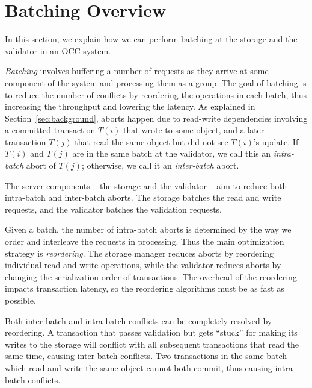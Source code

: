 \section{Batching Overview}\label{sec:overview}

In this section, we explain how we can perform batching at the storage and the validator in an OCC system. 

\emph{Batching} involves buffering a number of requests as they arrive at some component of the system and processing them as a group. The goal of batching is to reduce the number of conflicts by reordering the operations in each batch, thus increasing the throughput and lowering the latency. As explained in Section~\ref{sec:background}, aborts happen due to read-write dependencies involving a committed transaction $T(i)$ that wrote to some object, and a later transaction $T(j)$ that read the same object but did not see $T(i)$'s update. If $T(i)$ and $T(j)$ are in the same batch at the validator, we call this an \emph{intra-batch} abort of $T(j)$; otherwise, we call it an \emph{inter-batch} abort.

The server components -- the storage and the validator -- aim to reduce both intra-batch and inter-batch aborts. The storage batches the read and write requests, and the validator batches the validation requests.

Given a batch, the number of intra-batch aborts is determined by the way we order and interleave the requests in processing. Thus the main optimization strategy is \emph{reordering}. The storage manager reduces aborts by reordering individual read and write operations, while the validator reduces aborts by changing the serialization order of transactions. The overhead of the reordering impacts transaction latency, so the reordering algorithms must be as fast as possible.

Both inter-batch and intra-batch conflicts can be completely resolved by reordering. A transaction that passes validation but gets ``stuck'' for making its writes to the storage will conflict with all subsequent transactions that read the same time, causing  inter-batch conflicts. Two transactions in the same batch which read and write the same object cannot both commit, thus causing intra-batch conflicts.


